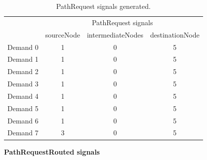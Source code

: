 \begin{table}[H]
	\centering
	\begin{tabular}{c|c|c|c|}
		\cline{2-4}
		\multicolumn{1}{l|}{}          & \multicolumn{3}{c|}{PathRequest signals}         \\ \cline{2-4}
		\multicolumn{1}{l|}{}          & sourceNode & intermediateNodes & destinationNode \\ \hline
		\multicolumn{1}{|l|}{Demand 0} & 1          & 0                 & 5               \\ \hline
		\multicolumn{1}{|c|}{Demand 1} & 1          & 0                 & 5               \\ \hline
		\multicolumn{1}{|c|}{Demand 2} & 1          & 0                 & 5               \\ \hline
		\multicolumn{1}{|c|}{Demand 3} & 1          & 0                 & 5               \\ \hline
		\multicolumn{1}{|c|}{Demand 4} & 1          & 0                 & 5               \\ \hline
		\multicolumn{1}{|c|}{Demand 5} & 1          & 0                 & 5               \\ \hline
		\multicolumn{1}{|c|}{Demand 6} & 1          & 0                 & 5               \\ \hline
		\multicolumn{1}{|c|}{Demand 7} & 3          & 0                 & 5               \\ \hline
	\end{tabular}
	\caption{PathRequest signals generated.}
	\label{pathrequest_example}
\end{table}
\textbf{PathRequestRouted signals}
